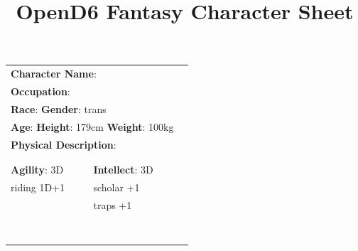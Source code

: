 \documentclass[10pt]{article}
\title{OpenD6 Fantasy Character Sheet}
\begin{document}
\pagestyle{fancy}
\fancyhf{}
\fancyfoot[R]{\thepage}
\renewcommand{\headrulewidth}{0pt}


\cleardoublepage
\begin{table}
\begin{tabular}{m{156pt} m{156pt} m{156pt}}
    \multicolumn{2}{l}{\textbf{Character Name}:  \hrulefill} \\
    \multicolumn{2}{l}{\textbf{Occupation}:  \hrulefill} \\
    \multicolumn{2}{l}{\textbf{Race}:  \hrulefill \hspace{1em} \textbf{Gender}: trans \hrulefill} \\
    \multicolumn{2}{l}{\textbf{Age}:  \hrulefill \hspace{1em} \textbf{Height}: 179cm \hrulefill \hspace{1em}  \textbf{Weight}: 100kg \hrulefill } \\
    \multicolumn{2}{l}{\textbf{Physical Description}:  \hrulefill } \\
    \multicolumn{2}{l}{ \hrulefill } \\
 & & \\
\textbf{Agility}: 3D \hrulefill      & \textbf{Intellect}: 3D \hrulefill  &                             \\

riding          1D+1 \hrulefill & scholar           +1 \hrulefill & \\

 \hrulefill & traps             +1 \hrulefill & \\

 \hrulefill &  \hrulefill & \\

 \hrulefill &  \hrulefill & \\

 \hrulefill &  \hrulefill & \\

 \hrulefill &  \hrulefill & \\

 \hrulefill &  \hrulefill & \\

 \hrulefill &  \hrulefill & \\

 \hrulefill &  \hrulefill & \\

 \hrulefill &  \hrulefill & \\


\end{tabular}
\end{table}
\end{document}
